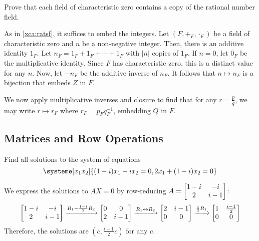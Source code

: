 \begin{xca}
  Prove that each field of characteristic zero contains a copy of the rational number field.
\end{xca}
\begin{prf}
  As in \cref{xca:ratsf}, it suffices to embed the integers.
  Let $(F, +_F, \cdot_F)$ be a field of characteristic zero and $n$ be a non-negative integer.
  Then, there is an additive identity $1_F$.
  Let $n_F = 1_F + 1_F + \dotsb + 1_F$ with $|n|$ copies of $1_F$.
  If $n = 0$, let $0_F$ be the multiplicative identity.
  Since $F$ has characteristic zero, this is a distinct value for any $n$.
  Now, let $-n_F$ be the additive inverse of $n_F$.
  It follows that $n \mapsto n_F$ is a bijection that embeds $Z$ in $F$.

  We now apply multiplicative inverses and closure to find that for any $r = \frac{p}{q}$,
  we may write $r \mapsto r_F$ where $r_F = p_F q_F^{-1}$, embedding $Q$ in $F$.
\end{prf}

\subsection{Matrices and Row Operations}

\begin{xca}
  Find all solutions to the system of equations
  \[ \systeme[x_1x_2]{{(1-i)}x_1 - ix_2 = 0, 2x_1 + {(1-i)}x_2 = 0} \]
\end{xca}
\begin{sol}
  We express the solutions to $AX = 0$ by row-reducing $A = \mqty[1-i&-i\\2&i-1]$:
  \[
    \mqty[1-i&-i\\2&i-1]
    \xto{R_1 - \frac{1-i}{2}R_2} \mqty[0&0\\2&i-1]
    \xto{R_1 \harr R_2} \mqty[2&i-1\\0&0]
    \xto{\frac12 R_1} \mqty[1&\frac{i-1}{2}\\0&0]
  \]
  Therefore, the solutions are $(c, \frac{i-1}{2}c)$ for any $c$.
\end{sol}

